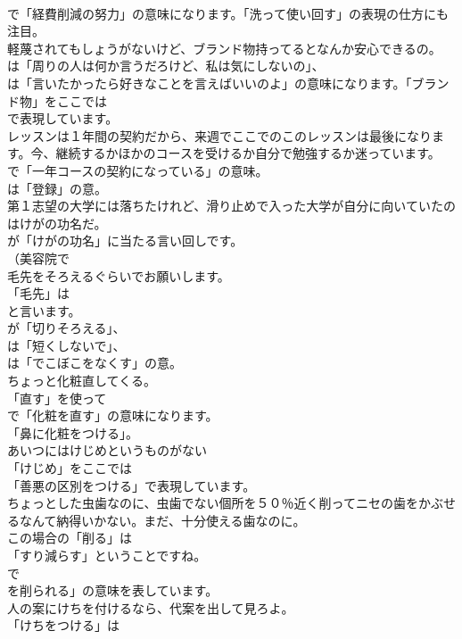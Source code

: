 \documentclass[8pt]{extreport}
\begin{document}
\begin{CJK}{UTF8}{min}
\\	で「経費削減の努力」の意味になります。「洗って使い回す」の表現の仕方にも注目。	
\\	軽蔑されてもしょうがないけど、ブランド物持ってるとなんか安心できるの。 
\\	は「周りの人は何か言うだろけど、私は気にしないの」、
\\	は「言いたかったら好きなことを言えばいいのよ」の意味になります。「ブランド物」をここでは
\\	で表現しています。	
\\	レッスンは１年間の契約だから、来週でここでのこのレッスンは最後になります。今、継続するかほかのコースを受けるか自分で勉強するか迷っています。 
\\	で「一年コースの契約になっている」の意味。
\\	は「登録」の意。	
\\	第１志望の大学には落ちたけれど、滑り止めで入った大学が自分に向いていたのはけがの功名だ。 
\\	が「けがの功名」に当たる言い回しです。	
\\	（美容院で 
\\	毛先をそろえるぐらいでお願いします。 
\\	「毛先」は
\\	と言います。
\\	が「切りそろえる」、
\\	は「短くしないで」、
\\	は「でこぼこをなくす」の意。	
\\	ちょっと化粧直してくる。 
\\	「直す」を使って
\\	で「化粧を直す」の意味になります。
\\	「鼻に化粧をつける」。	
\\	あいつにはけじめというものがない 
\\	「けじめ」をここでは
\\	「善悪の区別をつける」で表現しています。	
\\	ちょっとした虫歯なのに、虫歯でない個所を５０％近く削ってニセの歯をかぶせるなんて納得いかない。まだ、十分使える歯なのに。 
\\	この場合の「削る」は
\\	「すり減らす」ということですね。
\\	で
\\	を削られる」の意味を表しています。	
\\	人の案にけちを付けるなら、代案を出して見ろよ。 
\\	「けちをつける」は

\end{CJK}
\end{document}
